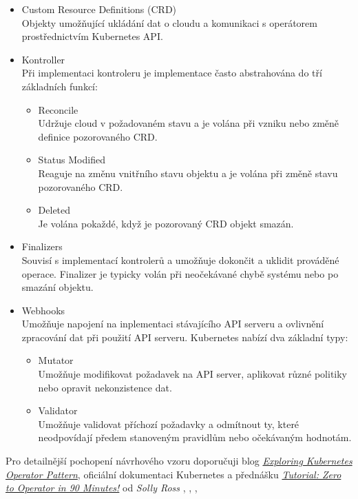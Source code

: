 \begin{itemize}
    \item Custom Resource Definitions (CRD)\\
    Objekty umožňující ukládání dat o cloudu a komunikaci s operátorem prostřednictvím Kubernetes API.
    \item Kontroller\\
    Při implementaci kontroleru je implementace často abstrahována do tří základních funkcí:
    \begin{itemize}
        \item Reconcile\\
        Udržuje cloud v požadovaném stavu a je volána při vzniku nebo změně definice pozorovaného CRD.
        \item Status Modified\\
        Reaguje na změnu vnitřního stavu objektu a je volána při změně stavu pozorovaného CRD.
        \item Deleted\\
        Je volána pokaždé, když je pozorovaný CRD objekt smazán.
    \end{itemize}
    \item Finalizers\\
    Souvisí s implementací kontrolerů a umožňuje dokončit a uklidit prováděné operace. Finalizer je typicky volán při neočekávané chybě systému nebo po smazání objektu.
    \item Webhooks\\
    Umožňuje napojení na inplementaci stávajícího API serveru a ovlivnění zpracování dat při použití API serveru. Kubernetes nabízí dva základní typy:
    \begin{itemize}
        \item Mutator\\
        Umožňuje modifikovat požadavek na API server, aplikovat různé politiky nebo opravit nekonzistence dat.
        \item Validator\\
        Umožňuje validovat příchozí požadavky a odmítnout ty, které neodpovídají předem stanoveným pravidlům nebo očekávaným hodnotám.
    \end{itemize}
\end{itemize}
Pro detailnější pochopení návrhového vzoru doporučuji blog \href{https://iximiuz.com/en/posts/kubernetes-operator-pattern/}{\textit{Exploring Kubernetes Operator Pattern}}, oficiální dokumentaci Kubernetes a přednášku \href{https://youtu.be/KBTXBUVNF2I}{\textit{Tutorial: Zero to Operator in 90 Minutes!}} od \textit{Solly Ross}
 \cite{bhler_2021_kubeops},
 \cite{kaplan_2022_argocd},
 \cite{velichko_2021_exploring},
 \cite{cncfcloudnativecomputingfoundation_2020_tutorial}

